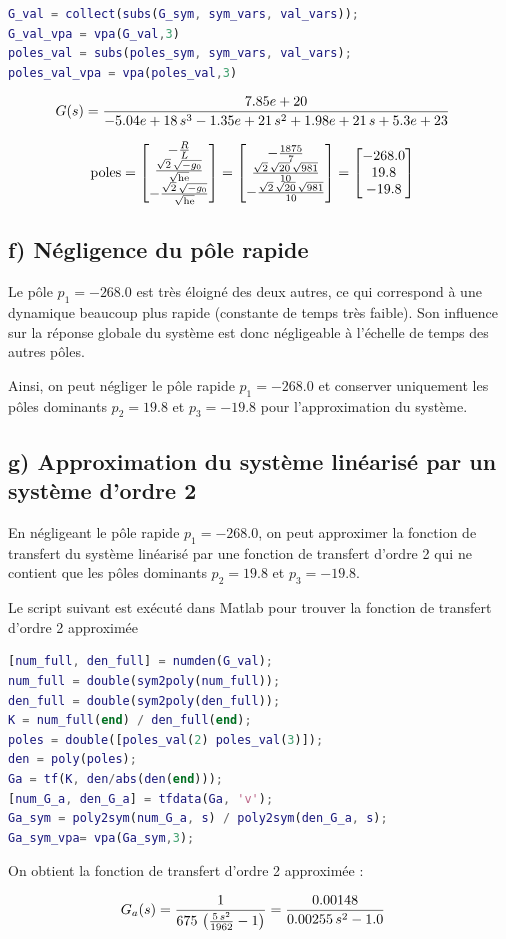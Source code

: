 \begin{lstlisting}[language=Matlab]
G_val = collect(subs(G_sym, sym_vars, val_vars));
G_val_vpa = vpa(G_val,3)
poles_val = subs(poles_sym, sym_vars, val_vars);
poles_val_vpa = vpa(poles_val,3)
\end{lstlisting}

\begin{align}
    G(s) &= \frac{7.85e+20}{-5.04e+18\,s^3-1.35e+21\,s^2+1.98e+21\,s+5.3e+23}
\end{align}

\begin{align}
    \text{poles} &=\begin{bmatrix} -\frac{R}{L}\\ \frac{\sqrt{2}\,\sqrt{-g_{0}}}{\sqrt{\mathrm{he}}}\\ -\frac{\sqrt{2}\,\sqrt{-g_{0}}}{\sqrt{\mathrm{he}}} \end{bmatrix}= \begin{bmatrix} -\frac{1875}{7}\\ \frac{\sqrt{2}\,\sqrt{20}\,\sqrt{981}}{10}\\ -\frac{\sqrt{2}\,\sqrt{20}\,\sqrt{981}}{10} \end{bmatrix}=\begin{bmatrix} -268.0\\ 19.8\\ -19.8 \end{bmatrix}
\end{align}

\subsection{f) Négligence du pôle rapide}
Le pôle $p_1 = -268.0$ est très éloigné des deux autres, ce qui correspond à une dynamique beaucoup plus rapide (constante de temps très faible). Son influence sur la réponse globale du système est donc négligeable à l’échelle de temps des autres pôles.

Ainsi, on peut négliger le pôle rapide $p_1 = -268.0$ et conserver uniquement les pôles dominants $p_2 = 19.8$ et $p_3 = -19.8$ pour l’approximation du système.

\subsection{g) Approximation du système linéarisé par un système d’ordre 2}

En négligeant le pôle rapide $p_1 = -268.0$, on peut approximer la fonction de transfert du système linéarisé par une fonction de transfert d’ordre 2 qui ne contient que les pôles dominants $p_2 = 19.8$ et $p_3 = -19.8$.

Le script suivant est exécuté dans Matlab pour trouver la fonction de transfert d’ordre 2 approximée

\begin{lstlisting}[language=Matlab]
[num_full, den_full] = numden(G_val);
num_full = double(sym2poly(num_full));
den_full = double(sym2poly(den_full));
K = num_full(end) / den_full(end);
poles = double([poles_val(2) poles_val(3)]);
den = poly(poles);
Ga = tf(K, den/abs(den(end)));
[num_G_a, den_G_a] = tfdata(Ga, 'v');
Ga_sym = poly2sym(num_G_a, s) / poly2sym(den_G_a, s);
Ga_sym_vpa= vpa(Ga_sym,3);
\end{lstlisting}

On obtient la fonction de transfert d’ordre 2 approximée :

\begin{align}
    G_a(s) &= \frac{1}{675\,\left(\frac{5\,s^2}{1962}-1\right)}=\frac{0.00148}{0.00255\,s^2-1.0}
\end{align}